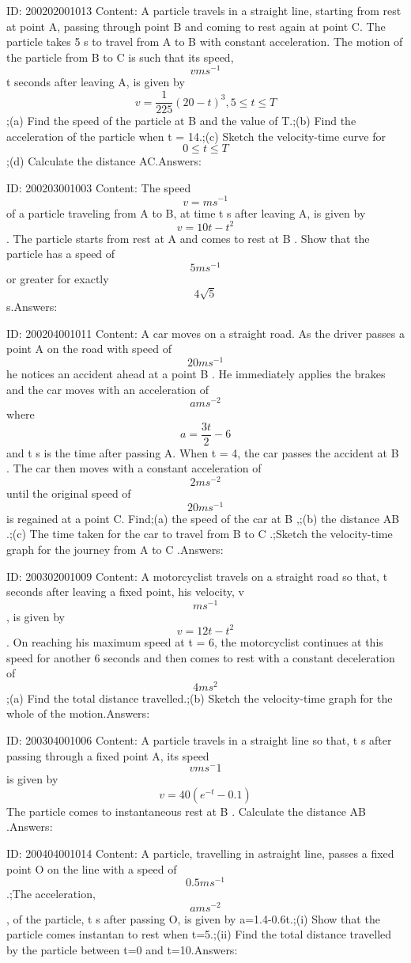 \documentclass{article}
\begin{document}
ID: 200202001013
Content:
A particle travels in a straight line, starting from rest at point A, passing through point B and coming to rest again at point C. The particle takes 5 s to travel from A to B with constant acceleration. The motion of the particle from B to C is such that its speed, \[v ms^{-1}\] t seconds after leaving A, is given by $$v=\frac{1}{225}(20-t)^3, 5\leq t\leq T$$;(a)	Find the speed of the particle at B and the value of T.;(b)	Find the acceleration of the particle when t = 14.;(c)	Sketch the velocity-time curve for $$0\leq t\leq T$$;(d)	Calculate the distance AC.Answers:

ID: 200203001003
Content:
The speed $$v=ms^{-1}$$ of a particle traveling from A to B, at time t s after leaving A, is given by $$v=10t-t^2$$. The particle starts from rest at A and comes to rest at B . Show that the particle has a speed of $$5ms^{-1}$$or greater for exactly $$4\sqrt5$$s.Answers:

ID: 200204001011
Content:
A car moves on a straight road. As the driver passes a point A on the road with speed of $$20ms^{-1}$$ he notices an accident ahead at a point B . He immediately applies the brakes and the car moves with an acceleration of $$a ms^{-2}$$ where $$a=\frac{3t }{2}-6$$ and t s is the time after passing A. When t = 4, the car passes the accident at B . The car then moves with a constant acceleration of $$2 ms^{-2}$$ until the original speed of $$20ms^{-1}$$ is regained at a point C. Find;(a)	the speed of the car at B ,;(b)	the distance AB .;(c)	The time taken for the car to travel from B to C .;Sketch the velocity-time graph for the journey from A to C .Answers:

ID: 200302001009
Content:
A motorcyclist travels on a straight road so that, t seconds after leaving a fixed point, his velocity, v $$ms^{-1}$$, is given by $$v=12t-t^2$$. On reaching his maximum speed at t = 6, the motorcyclist continues at this speed for another 6 seconds and then comes to rest with a constant deceleration of $$4ms^2$$;(a)	Find the total distance travelled.;(b)	Sketch the velocity-time graph for the whole of the motion.Answers:

ID: 200304001006
Content:
A particle travels in a straight line so that, t s after passing through a fixed point A, its speed $$vms^-1$$ is given by $$v=40(e^{-t}-0.1)$$ The particle comes to instantaneous rest at B . Calculate the distance AB .Answers:

ID: 200404001014
Content:
A particle, travelling in astraight line, passes a fixed point O on the line with a speed of $$0.5ms^{-1}$$.;The acceleration, $$ams^{-2}$$, of the particle, t s after passing O, is given by a=1.4-0.6t.;(i)	Show that the particle comes instantan to rest when t=5.;(ii)	Find the total distance travelled by the particle between t=0 and t=10.Answers:
\end{document}
